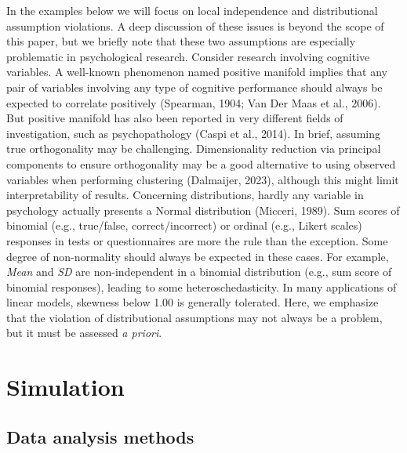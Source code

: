 \documentclass[
  man,floatsintext]{apa6}
\begin{document}
In the examples below we will focus on local independence and distributional assumption violations. A deep discussion of these issues is beyond the scope of this paper, but we briefly note that these two assumptions are especially problematic in psychological research. Consider research involving cognitive variables. A well-known phenomenon named positive manifold implies that any pair of variables involving any type of cognitive performance should always be expected to correlate positively (Spearman, 1904; Van Der Maas et al., 2006). But positive manifold has also been reported in very different fields of investigation, such as psychopathology (Caspi et al., 2014). In brief, assuming true orthogonality may be challenging. Dimensionality reduction via principal components to ensure orthogonality may be a good alternative to using observed variables when performing clustering (Dalmaijer, 2023), although this might limit interpretability of results. Concerning distributions, hardly any variable in psychology actually presents a Normal distribution (Micceri, 1989). Sum scores of binomial (e.g., true/false, correct/incorrect) or ordinal (e.g., Likert scales) responses in tests or questionnaires are more the rule than the exception. Some degree of non-normality should always be expected in these cases. For example, \emph{Mean} and \emph{SD} are non-independent in a binomial distribution (e.g., sum score of binomial responses), leading to some heteroschedasticity. In many applications of linear models, skewness below 1.00 is generally tolerated. Here, we emphasize that the violation of distributional assumptions may not always be a problem, but it must be assessed \emph{a priori}.

\hypertarget{simulation}{%
\section{Simulation}\label{simulation}}

\hypertarget{data-analysis-methods}{%
\subsection{Data analysis methods}\label{data-analysis-methods}}
\end{document}
